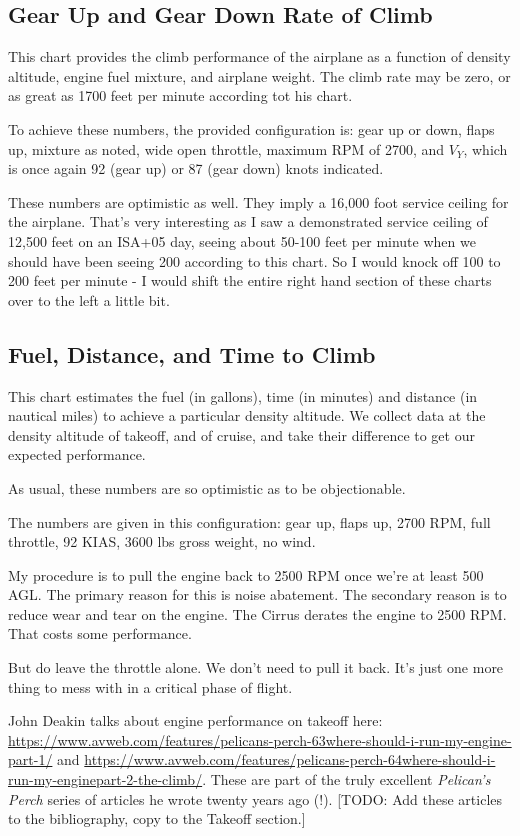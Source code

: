 \subsection{Gear Up and Gear Down Rate of Climb}

This chart provides the climb performance of the airplane as a function of density altitude, engine fuel mixture, and airplane weight. The climb rate may be zero, or as great as 1700 feet per minute according tot his chart.

To achieve these numbers, the provided configuration is: gear up or down, flaps up, mixture as noted, wide open throttle, maximum RPM of 2700, and $V_Y$, which is once again 92 (gear up) or 87 (gear down) knots indicated.

These numbers are optimistic as well. They imply a 16,000 foot service ceiling for the airplane. That's very interesting as I saw a demonstrated service ceiling of 12,500 feet on an ISA+05 day, seeing about 50-100 feet per minute when we should have been seeing 200 according to this chart. So I would knock off 100 to 200 feet per minute - I would shift the entire right hand section of these charts over to the left a little bit.

\subsection{Fuel, Distance, and Time to Climb}

This chart estimates the fuel (in gallons), time (in minutes) and distance (in nautical miles) to achieve a particular density altitude. We collect data at the density altitude of takeoff, and of cruise, and take their difference to get our expected performance.

As usual, these numbers are so optimistic as to be objectionable.

The numbers are given in this configuration: gear up, flaps up, 2700 RPM, full throttle, 92 KIAS, 3600 lbs gross weight, no wind.

My procedure is to pull the engine back to 2500 RPM once we're at least 500 AGL. The primary reason for this is noise abatement. The secondary reason is to reduce wear and tear on the engine. The Cirrus derates the engine to 2500 RPM. That costs some performance.

But do leave the throttle alone. We don't need to pull it back. It's just one more thing to mess with in a critical phase of flight.

John Deakin talks about engine performance on takeoff here: \url{https://www.avweb.com/features/pelicans-perch-63where-should-i-run-my-engine-part-1/} and \url{https://www.avweb.com/features/pelicans-perch-64where-should-i-run-my-enginepart-2-the-climb/}. These are part of the truly excellent \emph{Pelican's Perch} series of articles he wrote twenty years ago (!). [TODO: Add these articles to the bibliography, copy to the Takeoff section.]

